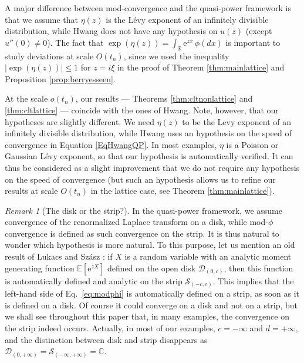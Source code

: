 \documentclass[12pt,a4paper,reqno]{amsart}
\theoremstyle{remark}
\newtheorem{remark}[lemma]{Remark}
\newcommand{\R}{\mathbb{R}}
\newcommand{\C}{\mathbb{C}}
\newcommand{\E}{\mathrm{e}}
\newcommand{\esper}{\mathbb{E}}
\begin{document}
A major difference between mod-convergence and the quasi-power framework
is that we assume that $\eta(z)$ is the L\'evy exponent of an infinitely divisible distribution,
while Hwang does not have any hypothesis on $u(z)$ (except $u''(0) \ne 0$).
The fact that $\exp(\eta(z)) = \int_{\R} \E^{zx}\, \phi(dx)$ is important
to study deviations at scale $O(t_n)$,
since we used the inequality $|\exp(\eta(z))| \le 1$ for $z=i\xi$
in the proof of Theorem \ref{thm:mainlattice} and Proposition \ref{prop:berryesseen}.
\bigskip


At the scale $o(t_n)$, our results --- Theorems \ref{thm:cltnonlattice} and \ref{thm:cltlattice} ---
coincide with the ones of Hwang.
Note, however, that our hypotheses are slightly different.
We need $\eta(z)$ to be the Levy exponent of an infinitely divisible distribution,
while Hwang uses an hypothesis
on the speed of convergence in Equation \eqref{EqHwangQP}.
In most examples, $\eta$ is a Poisson or Gaussian Lévy exponent,
so that our hypothesis is automatically verified.
It can thus be considered as a slight improvement that 
we do not require any hypothesis on the speed of convergence
(but such an hypothesis allows us to refine our results at scale $O(t_n)$
in the lattice case, see Theorem \ref{thm:mainlattice}).

\begin{remark}[The disk or the strip?]
    In the quasi-power framework, we assume convergence of the renormalized 
    Laplace transform on a disk, while mod-$\phi$ convergence is defined
    as such convergence on the strip.
    It is thus natural to wonder which hypothesis is more natural. To this purpose, let us mention an old result of Lukacs and Szász \cite[Theorem 2]{LS52}: if $X$ is a random variable with an analytic moment generating function $\esper[\E^{zX}]$ defined on the open disk $\mathcal{D}_{(0,c)}$, then this function is automatically defined and analytic on the strip $\mathcal{S}_{(-c,c)}$. This implies that the left-hand side of Eq.~\eqref{eq:modphi} is automatically defined on a strip, as soon as it is defined on a disk. Of course it could converge on a disk and not on a strip, but we shall see throughout this paper that, in many examples, the convergence on the strip indeed occurs. Actually, in most of our examples, $c=-\infty$ and $d=+\infty$, and the distinction between disk and strip disappears as $\mathcal{D}_{(0,+\infty)}=\mathcal{S}_{(-\infty,+\infty)}=\C$.
\label{rem:diskorstrip}
\end{remark}\medskip
\end{document}
